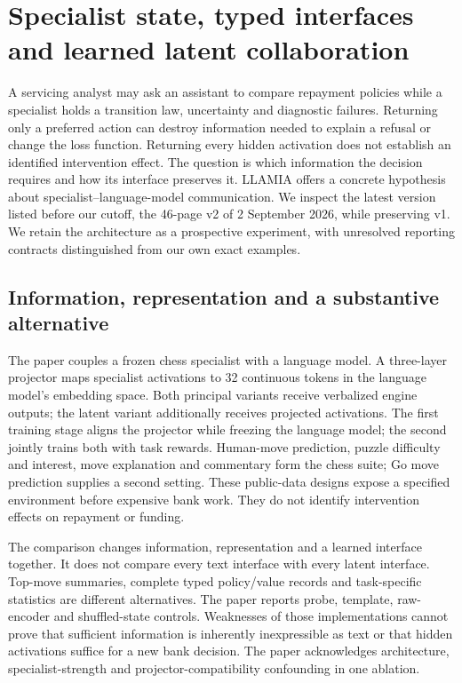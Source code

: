 \section{Specialist state, typed interfaces and learned latent collaboration}
\label{sec:exec24-collaboration}
A servicing analyst may ask an assistant to compare repayment policies while a specialist holds a transition law, uncertainty and diagnostic failures. Returning only a preferred action can destroy information needed to explain a refusal or change the loss function. Returning every hidden activation does not establish an identified intervention effect. The question is which information the decision requires and how its interface preserves it. LLAMIA offers a concrete hypothesis about specialist--language-model communication. We inspect the latest version listed before our cutoff, the 46-page v2 of 2 September 2026, while preserving v1. We retain the architecture as a prospective experiment, with unresolved reporting contracts distinguished from our own exact examples.\citep{exec24_collaboration_original,exec24_collaboration_reference}

\subsection{Information, representation and a substantive alternative}
The paper couples a frozen chess specialist with a language model. A three-layer projector maps specialist activations to 32 continuous tokens in the language model's embedding space. Both principal variants receive verbalized engine outputs; the latent variant additionally receives projected activations. The first training stage aligns the projector while freezing the language model; the second jointly trains both with task rewards. Human-move prediction, puzzle difficulty and interest, move explanation and commentary form the chess suite; Go move prediction supplies a second setting. These public-data designs expose a specified environment before expensive bank work. They do not identify intervention effects on repayment or funding.\citep{exec24_collaboration_original}

The comparison changes information, representation and a learned interface together. It does not compare every text interface with every latent interface. Top-move summaries, complete typed policy/value records and task-specific statistics are different alternatives. The paper reports probe, template, raw-encoder and shuffled-state controls. Weaknesses of those implementations cannot prove that sufficient information is inherently inexpressible as text or that hidden activations suffice for a new bank decision. The paper acknowledges architecture, specialist-strength and projector-compatibility confounding in one ablation.\citep{exec24_collaboration_original}

